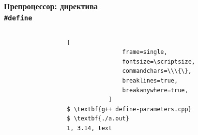\documentclass[compress]{beamer}
\begin{document}
\begin{frame}[fragile]

    \frametitle{Препроцессор: директива \\ \texttt{\#define}}

    \begin{columns}[T]

        \begin{column}{0.5\textwidth}


        \end{column}

        \begin{column}{0.5\textwidth}

            \begin{Verbatim}[
                frame=single,
                fontsize=\scriptsize,
                commandchars=\\\{\},
                breaklines=true,
                breakanywhere=true,
            ]
$ \textbf{g++ define-parameters.cpp}
$ \textbf{./a.out}
1, 3.14, text
            \end{Verbatim}

        \end{column}

    \end{columns}

\end{frame}
\end{document}
